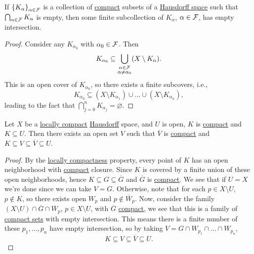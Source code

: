 \begin{theorem}
	If \(\left\{ K_\alpha  \right\}_{\alpha \in \mathcal{\MakeUppercase{f}} } \) is a collection of \hyperref[def:compact]{compact} subsets of a \hyperref[def:Hausdorff]{Hausdorff space} such that \(\bigcap_{\alpha \in \mathcal{\MakeUppercase{f}} } K_\alpha \) is empty, then some finite subcollection of \(K_\alpha \), \(\alpha \in \mathcal{\MakeUppercase{f}} \), has empty intersection.
\end{theorem}
\begin{proof}
	Consider any \(K_{\alpha_0} \) with \(\alpha _0\in \mathcal{\MakeUppercase{f}} \). Then
	\[
		K_{\alpha _0} \subseteq \bigcup_{\substack{\alpha \in \mathcal{\MakeUppercase{f}} \\ \alpha \neq \alpha _0}} (X\setminus K_\alpha ).
	\]
	This is an open cover of \(K_{\alpha _0}\), so there exists a finite subcovers, i.e.,
	\[
		K_{\alpha _0} \subseteq (X \setminus K_{\alpha _1}) \cup \ldots \cup (X \setminus K_{\alpha _n}),
	\]
	leading to the fact that \(\bigcap_{j=0}^{n} K_{\alpha _j} = \varnothing \).
\end{proof}

\begin{theorem}\label{thm:open-between-compact}
	Let \(X\) be a \hyperref[def:locally-compact]{locally compact} \hyperref[def:Hausdorff]{Hausdorff} space, and \(U\) is open, \(K\) is \hyperref[def:compact]{compact} and \(K \subseteq U\). Then there exists an open set \(V\) such that \(\overline{V} \) is \hyperref[def:compact]{compact} and \(K \subseteq V \subseteq \overline{V} \subseteq U\).
\end{theorem}
\begin{proof}
	By the \hyperref[def:locally-compact]{locally compactness} property, every point of \(K\) has an open neighborhood with \hyperref[def:compact]{compact} closure. Since \(K\) is covered by a finite union of these open neighborhoods, hence \(K \subseteq G \subseteq \overline{G} \) and \(\overline{G} \) is \hyperref[def:compact]{compact}. We see that if \(U = X\) we're done since we can take \(V = G\). Otherwise, note that for each \(p\in X \setminus U\), \(p\notin K\), so there exists open \(W_p\) and \(p \notin \overline{W} _p\). Now, consider the family \((X \setminus U) \cap \overline{G} \cap \overline{W} _p\), \(p\in X\setminus U\), with \(\overline{G} \) \hyperref[def:compact]{compact}, we see that this is a family of \hyperref[def:compact]{compact sets} with empty intersection. This means there is a finite number of these \(p_1, \ldots  , p_n\) have empty intersection, so by taking \(V = G \cap W_{p_1} \cap \ldots  \cap W_{p_n}\),
	\[
		K \subseteq V \subseteq \overline{V} \subseteq U.
	\]
\end{proof}

